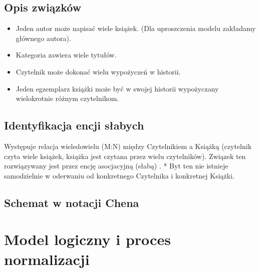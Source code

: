 \documentclass[letterpaper,10pt,english]{sphinxmanual}
\begin{document}
\subsection{Opis związków}
\label{\detokenize{rozdzial_3/index:opis-zwiazkow}}\begin{itemize}
\item {} 
\sphinxAtStartPar
{} Jeden autor może napisać wiele książek. (Dla uproszczenia modelu zakładamy głównego autora).

\item {} 
\sphinxAtStartPar
{} Kategoria zawiera wiele tytułów.

\item {} 
\sphinxAtStartPar
{} Czytelnik może dokonać wielu wypożyczeń w historii.

\item {} 
\sphinxAtStartPar
{} Jeden egzemplarz książki może być w swojej historii wypożyczany wielokrotnie różnym czytelnikom.

\end{itemize}


\subsection{Identyfikacja encji słabych}
\label{\detokenize{rozdzial_3/index:identyfikacja-encji-slabych}}
\sphinxAtStartPar
Występuje relacja wiele\sphinxhyphen{}do\sphinxhyphen{}wielu (M:N) między Czytelnikiem a Książką (czytelnik czyta wiele książek, książka jest czytana przez wielu czytelników). Związek ten rozwiązywany jest przez encję asocjacyjną (słabą) .
*  Byt ten nie istnieje samodzielnie w oderwaniu od konkretnego Czytelnika i konkretnej Książki.


\subsection{Schemat w notacji Chena}
\label{\detokenize{rozdzial_3/index:schemat-w-notacji-chena}}
\noindent{}


\section{Model logiczny i proces normalizacji}
\label{\detokenize{rozdzial_3/index:model-logiczny-i-proces-normalizacji}}
\end{document}
